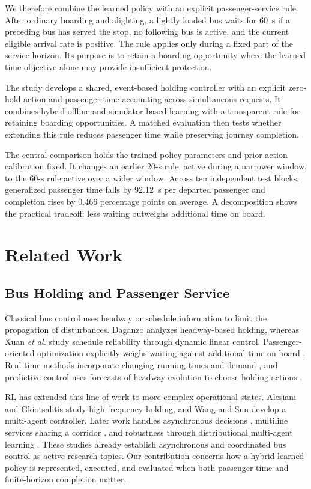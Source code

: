 \documentclass[letterpaper,journal]{IEEEtran}
\begin{document}
We therefore combine the learned policy with an explicit passenger-service rule. After ordinary boarding and alighting, a lightly loaded bus waits for 60~s if a preceding bus has served the stop, no following bus is active, and the current eligible arrival rate is positive. The rule applies only during a fixed part of the service horizon. Its purpose is to retain a boarding opportunity where the learned time objective alone may provide insufficient protection.

The study develops a shared, event-based holding controller with an explicit zero-hold action and passenger-time accounting across simultaneous requests. It combines hybrid offline and simulator-based learning with a transparent rule for retaining boarding opportunities. A matched evaluation then tests whether extending this rule reduces passenger time while preserving journey completion.

The central comparison holds the trained policy parameters and prior action calibration fixed. It changes an earlier 20-s rule, active during a narrower window, to the 60-s rule active over a wider window. Across ten independent test blocks, generalized passenger time falls by 92.12~s per departed passenger and completion rises by 0.466 percentage points on average. A decomposition shows the practical tradeoff: less waiting outweighs additional time on board.

\section{Related Work}
\label{sec:related}
\subsection{Bus Holding and Passenger Service}
Classical bus control uses headway or schedule information to limit the propagation of disturbances. Daganzo \cite{daganzo2009headway} analyzes headway-based holding, whereas Xuan \emph{et al.} \cite{xuan2011dynamic} study schedule reliability through dynamic linear control. Passenger-oriented optimization explicitly weighs waiting against additional time on board \cite{delgado2012holding}. Real-time methods incorporate changing running times and demand \cite{sanchezmartinez2016realtime}, and predictive control uses forecasts of headway evolution to choose holding actions \cite{andres2017predictive}.

RL has extended this line of work to more complex operational states. Alesiani and Gkiotsalitis \cite{alesiani2018reinforcement} study high-frequency holding, and Wang and Sun \cite{wang2020real} develop a multi-agent controller. Later work handles asynchronous decisions \cite{wang2021asynchronous}, multiline services sharing a corridor \cite{wang2023multiobjective}, and robustness through distributional multi-agent learning \cite{wang2023robust}. These studies already establish asynchronous and coordinated bus control as active research topics. Our contribution concerns how a hybrid-learned policy is represented, executed, and evaluated when both passenger time and finite-horizon completion matter.
\end{document}
